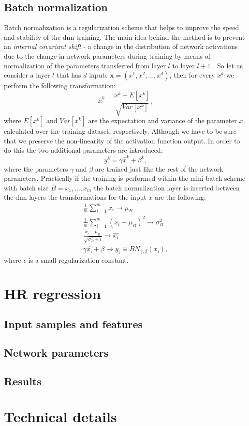 \subsection{Batch normalization}
Batch normalization is a regularization scheme that helps to improve the speed and stability of the \gls{dnn} training. The main idea behind the method is to prevent an \textit{internal covariant shift} - a change in the distribution of network activations due to the change in network parameters during training by means of normalization of the parameters transferred from layer $l$ to layer $l+1$  \cite{batch_normalization}. So let us consider a layer $l$ that has $d$ inputs $\textbf{x}=(x^1,x^2,...,x^d)$, then for every $x^k$ we perform the following transformation:
\begin{equation}
\label{eq::bn1}
\hat{x}^k=\frac{x^k-E[x^k]}{\sqrt{Var[x^k]}},
\end{equation}
where $E[x^k]$ and $Var[x^k]$ are the expectation and variance of the parameter $x$, calculated over the training dataset, respectively. Although we have to be sure that we preserve the non-linearity of the activation function output. In order to do this the two additional parameters are introduced:
\begin{equation}
\label{eq::bn2}
y^k=\gamma  \hat{x}^k + \beta^k ,
\end{equation}
where the parameters $\gamma$ and $\beta$ are trained just like the rest of the network parameters.
Practically if the training is performed within the mini-batch scheme with batch size $B={x_1,...,x_m}$ the batch normalization layer is inserted between the \gls{dnn} layers the transformations for the input $x$ are the following:
\begin{equation}
\begin{array}{lcl} 
\frac{1}{m}\sum_{i=1}^m x_i \rightarrow \mu_B\\
\frac{1}{m}\sum_{i=1}^m (x_i - \mu_B)^2 \rightarrow \sigma^2_B\\
\frac {x_i-\mu_B}{\sqrt{\sigma_B^2+\epsilon}} \rightarrow \hat{x_i}\\
\gamma \hat{x_i} + \beta \rightarrow y_i \equiv BN_{\gamma,\beta}(x_i),
\end{array}
\end{equation}
where $\epsilon$ is a small regularization constant.

 
\section{HR regression}
\subsection{Input samples and features}
\subsection{Network parameters}
\subsection{Results}

\section{Technical details}
